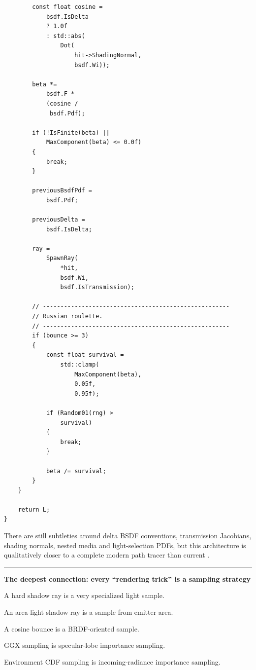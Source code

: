 \begin{verbatim}
        const float cosine =
            bsdf.IsDelta
            ? 1.0f
            : std::abs(
                Dot(
                    hit->ShadingNormal,
                    bsdf.Wi));

        beta *=
            bsdf.F *
            (cosine /
             bsdf.Pdf);

        if (!IsFinite(beta) ||
            MaxComponent(beta) <= 0.0f)
        {
            break;
        }

        previousBsdfPdf =
            bsdf.Pdf;

        previousDelta =
            bsdf.IsDelta;

        ray =
            SpawnRay(
                *hit,
                bsdf.Wi,
                bsdf.IsTransmission);

        // -----------------------------------------------------
        // Russian roulette.
        // -----------------------------------------------------
        if (bounce >= 3)
        {
            const float survival =
                std::clamp(
                    MaxComponent(beta),
                    0.05f,
                    0.95f);

            if (Random01(rng) >
                survival)
            {
                break;
            }

            beta /= survival;
        }
    }

    return L;
}
\end{verbatim}

There are still subtleties around delta BSDF conventions, transmission Jacobians, shading normals, nested media and light-selection PDFs, but this architecture is qualitatively closer to a complete modern path tracer than current .

\begin{center}\rule{0.5\linewidth}{0.5pt}\end{center}

\textbf{The deepest connection: every ``rendering trick'' is a sampling strategy}

A hard shadow ray is a very specialized light sample.

An area-light shadow ray is a sample from emitter area.

A cosine bounce is a BRDF-oriented sample.

GGX sampling is specular-lobe importance sampling.

Environment CDF sampling is incoming-radiance importance sampling.


